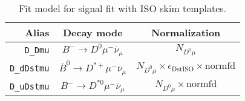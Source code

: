 


\begin{landscape}
\begin{table}
\centering
\caption{
    Fit model for \Dz signal fit with ISO skim templates.
}
\scriptsize

\begin{tabular}{r|c|c}
\toprule
           \textbf{Alias} &                                 \textbf{Decay mode}                                  &                                                                                                                                                                            \textbf{Normalization}                                                                                                                                                                             \\
\midrule
          \texttt{D\_Dmu} &                    $B^- \rightarrow D^0 \mu^- \overline{\nu}_\mu$                    &                                                                                                                                                                                 $N_{D^0 \mu}$                                                                                                                                                                                 \\
       \texttt{D\_dDstmu} &             $\overline{B}^0 \rightarrow D^{*+} \mu^- \overline{\nu}_\mu$             &                                                                                                                                                       $N_{D^0 \mu} \times \epsilon_\text{DstISO} \times \text{normfd}$                                                                                                                                                        \\
       \texttt{D\_uDstmu} &                  $B^- \rightarrow D^{*0} \mu^- \overline{\nu}_\mu$                   &                                                                                                                                                                      $N_{D^0 \mu} \times \text{normfd}$                                                                                                                                                                       \\

\end{tabular}
\end{table}
\end{landscape}
